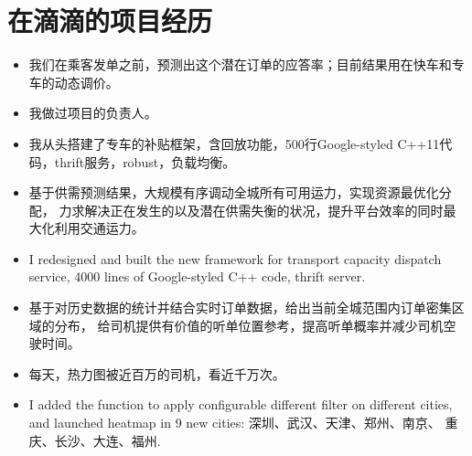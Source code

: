 \documentclass{resume}
\begin{document}
\section{在滴滴的项目经历}
 \begin{itemize}
    \item 我们在乘客发单之前，预测出这个潜在订单的应答率；目前结果用在快车和专车的动态调价。
 \end{itemize}

 \begin{itemize}
    \item 我做过项目的负责人。
 \end{itemize}

 \begin{itemize}
    \item 我从头搭建了专车的补贴框架，含回放功能，500行Google-styled C++11代码，thrift服务，robust，负载均衡。
 \end{itemize}

 \begin{itemize}
    \item 基于供需预测结果，大规模有序调动全城所有可用运力，实现资源最优化分配，
          力求解决正在发生的以及潜在供需失衡的状况，提升平台效率的同时最大化利用交通运力。
    \item I redesigned and built the new framework for transport capacity dispatch service, 4000 lines of Google-styled C++ code, thrift server.
 \end{itemize}

 \begin{itemize}
    \item 基于对历史数据的统计并结合实时订单数据，给出当前全城范围内订单密集区域的分布，
          给司机提供有价值的听单位置参考，提高听单概率并减少司机空驶时间。
    \item 每天，热力图被近百万的司机，看近千万次。
    \item I added the function to apply configurable different filter on different cities, 
          and launched heatmap in 9 new cities: 
          深圳、武汉、天津、郑州、南京、
          重庆、长沙、大连、福州.
 \end{itemize}
\end{document}
